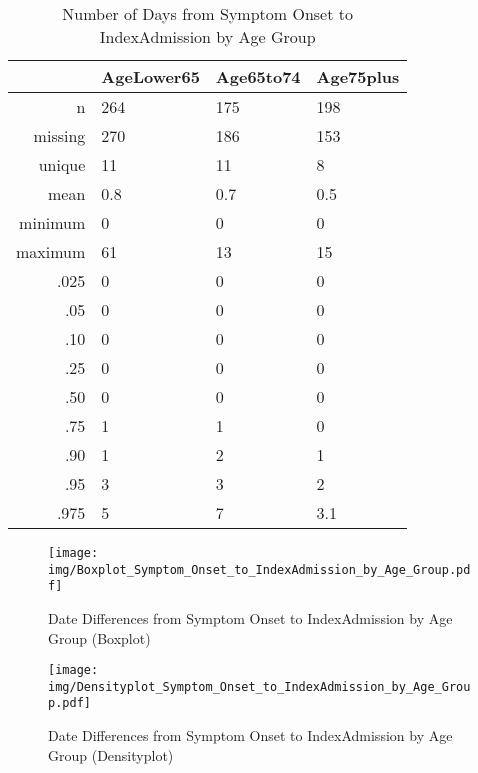 \documentclass[a4paper]{report}
\begin{document}
\begin{itemize}
{%
\begin{table}[ht]
\centering
\begin{tabular}{rlll}
  \toprule
 & AgeLower65 & Age65to74 & Age75plus \\ 
  \midrule
n & 264 & 175 & 198 \\ 
  missing & 270 & 186 & 153 \\ 
  unique & 11 & 11 & 8 \\ 
  mean & 0.8 & 0.7 & 0.5 \\ 
  minimum & 0 & 0 & 0 \\ 
  maximum & 61 & 13 & 15 \\ 
  .025 & 0 & 0 & 0 \\ 
  .05 & 0 & 0 & 0 \\ 
  .10 & 0 & 0 & 0 \\ 
  .25 & 0 & 0 & 0 \\ 
  .50 & 0 & 0 & 0 \\ 
  .75 & 1 & 1 & 0 \\ 
  .90 & 1 & 2 & 1 \\ 
  .95 & 3 & 3 & 2 \\ 
  .975 & 5 & 7 & 3.1 \\ 
   \bottomrule
\end{tabular}
\caption{Number of Days from Symptom Onset to IndexAdmission by Age Group} 
\end{table}
\begin{figure}
  \centering
  \caption{Date Differences from Symptom Onset to IndexAdmission by Age Group (Boxplot)}
  \label{Boxplot: Date Differences from Symptom Onset to IndexAdmission by Age Group}
\texttt{[image: img/Boxplot\_Symptom\_Onset\_to\_IndexAdmission\_by\_Age\_Group.pdf]}\end{figure}


\begin{figure}
  \centering
  \caption{Date Differences from Symptom Onset to IndexAdmission by Age Group (Densityplot)}
  \label{Density: Date Differences from Symptom Onset to IndexAdmission by Age Group}
\texttt{[image: img/Densityplot\_Symptom\_Onset\_to\_IndexAdmission\_by\_Age\_Group.pdf]}\end{figure}


\clearpage

}
\end{itemize}
\end{document}
